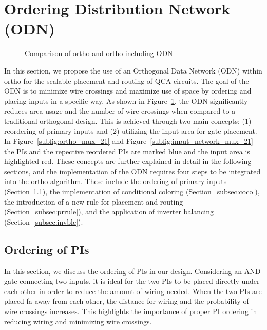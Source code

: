 \section{Ordering Distribution Network (ODN)}

\begin{figure}
	\centering
	\caption{Comparison of ortho and ortho including ODN}\label{fig:input_network_mux_21}
\end{figure}


In this section, we propose the use of an Orthogonal Data Network (ODN) within ortho for the scalable placement and routing of QCA circuits. The goal of the ODN is to minimize wire crossings and maximize use of space by ordering and placing inputs in a specific way. As shown in Figure~\ref{fig:input_network_mux_21}, the ODN significantly reduces area usage and the number of wire crossings when compared to a traditional orthogonal design. This is achieved through two main concepts: (1) reordering of primary inputs and (2) utilizing the input area for gate placement. In Figure~\ref{subfig:ortho_mux_21} and Figure~\ref{subfig:input_network_mux_21} the PIs and the repective reordered PIs are marked blue and the input area is highlighted red. These concepts are further explained in detail in the following sections, and the implementation of the ODN requires four steps to be integrated into the ortho algorithm. These include the ordering of primary inputs (Section~\ref{subsec:orderPI}), the implementation of conditional coloring (Section~\ref{subsec:coco}), the introduction of a new rule for placement and routing (Section~\ref{subsec:prrule}), and the application of inverter balancing (Section~\ref{subsec:invblc}).

\subsection{Ordering of PIs}\label{subsec:orderPI}

In this section, we discuss the ordering of PIs in our design. Considering an AND-gate connecting two inputs, it is ideal for the two PIs to be placed directly under each other in order to reduce the amount of wiring needed. When the two PIs are placed fa away from each other, the distance for wiring and the probability of wire crossings increases. This highlights the importance of proper PI ordering in reducing wiring and minimizing wire crossings.

